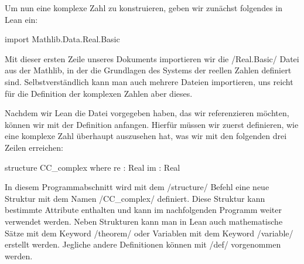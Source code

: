\documentclass[10pt]{article}
\begin{document}
\noindent Um nun eine komplexe Zahl zu konstruieren, geben wir zunächst folgendes in Lean ein:
\vspace{-0.1cm}
\begin{leancode}
import Mathlib.Data.Real.Basic
\end{leancode}
\vspace{-0.1cm}
\noindent Mit dieser ersten Zeile unseres Dokuments importieren wir die \lean/Real.Basic/ Datei aus der Mathlib, in der die Grundlagen des Systems der reellen Zahlen definiert sind.
\noindent Selbstverständlich kann man auch mehrere Dateien importieren, uns reicht für die Definition der komplexen Zahlen aber dieses. 

\noindent Nachdem wir Lean die Datei vorgegeben haben, das wir referenzieren möchten, können wir mit der Definition anfangen. Hierfür müssen wir zuerst definieren, wie eine komplexe Zahl überhaupt auszusehen hat, was wir mit den folgenden drei Zeilen erreichen: 
\vspace{-0.1cm}
\begin{leancode}
structure CC_complex where
  re : Real
  im : Real
\end{leancode}
\vspace{-0.1cm}
\noindent In diesem Programmabschnitt wird mit dem \lean/structure/ Befehl eine neue Struktur mit dem Namen \lean/CC_complex/ definiert. Diese Struktur kann bestimmte Attribute enthalten und kann im nachfolgenden Programm weiter verwendet werden. Neben Strukturen kann man in Lean auch mathematische Sätze mit dem Keyword \lean/theorem/ oder Variablen mit dem Keyword \lean/variable/ erstellt werden. Jegliche andere Definitionen können mit \lean/def/ vorgenommen werden.
\end{document}
